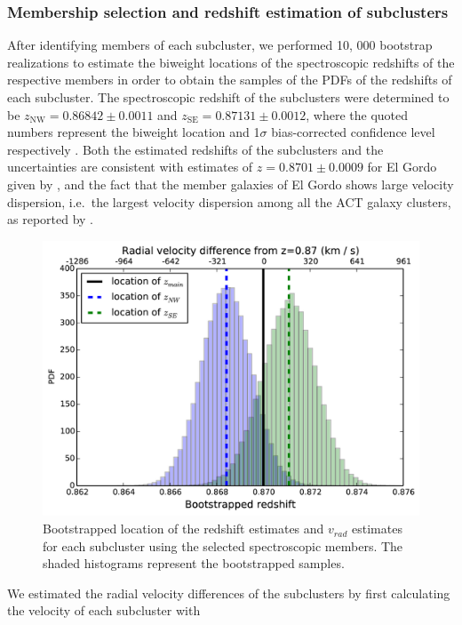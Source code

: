 \documentclass[letterpaper,useAMS,usenatbib]{mn2e}
\begin{document}
\subsubsection{Membership selection and redshift estimation of subclusters}
\label{subsubsec:membership_and_redshift}
After identifying members of each subcluster, 
we performed 10, 000 bootstrap realizations to estimate the biweight
locations of the spectroscopic redshifts of the respective members in order
to obtain the samples of the PDFs of the redshifts of each subcluster. 
The spectroscopic redshift of the subclusters were
determined to be 
$z_{\mathrm{NW}} = 0.86842 \pm 0.0011$ and 
$z_{\mathrm{SE}} = 0.87131 \pm 0.0012$, where the quoted numbers represent the
biweight location and 1$\sigma$ bias-corrected confidence level
respectively \citep{Beers90}.  
Both the estimated redshifts of the subclusters and the uncertainties are
consistent with estimates of $z=0.8701 \pm 0.0009$ for El Gordo given by 
\citealt{Sifon13}, and the fact that the
member galaxies of El
Gordo shows large velocity dispersion, i.e.\ the largest velocity
dispersion among all the ACT galaxy clusters, as reported by
.
\begin{figure}
	\includegraphics[width = \linewidth]{bootstrapped_redshift.png}
	\caption{Bootstrapped location of the
	redshift estimates and $v_{rad}$ estimates for each subcluster using the
	selected spectroscopic members. The shaded histograms represent the
	bootstrapped samples.
} \label{fig:bootstrap_redshift}
\end{figure}
We estimated the radial velocity differences of the
subclusters by first calculating the velocity of each subcluster with
\end{document}
